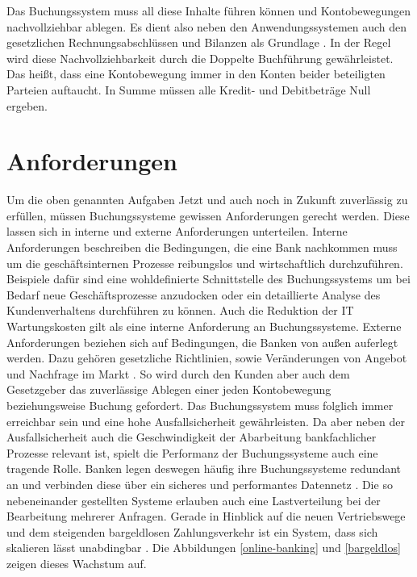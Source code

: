 \documentclass[12pt,oneside,a4paper,parskip]{scrbook}
\begin{document}
Das Buchungssystem muss all diese Inhalte führen können und Kontobewegungen nachvollziehbar ablegen. Es dient also neben den Anwendungssystemen auch den gesetzlichen Rechnungsabschlüssen und Bilanzen als Grundlage \cite{bankEnzy}\cite{MarkstudieKernbankensysteme}. In der Regel wird diese Nachvollziehbarkeit durch die Doppelte Buchführung gewährleistet. Das heißt, dass eine Kontobewegung immer in den Konten beider beteiligten Parteien auftaucht. In Summe müssen alle Kredit- und Debitbeträge Null ergeben\cite{accounting}.

\section{Anforderungen}
Um die oben genannten Aufgaben Jetzt und auch noch in Zukunft zuverlässig zu erfüllen, müssen Buchungssysteme gewissen Anforderungen gerecht werden. Diese lassen sich in interne und externe Anforderungen unterteilen. Interne Anforderungen beschreiben die Bedingungen, die eine Bank nachkommen muss um die geschäftsinternen Prozesse reibungslos und wirtschaftlich durchzuführen. Beispiele dafür sind eine wohldefinierte Schnittstelle des Buchungssystems um bei Bedarf neue Geschäftsprozesse anzudocken oder ein detaillierte Analyse des Kundenverhaltens durchführen zu können. Auch die Reduktion der IT Wartungskosten gilt als eine interne Anforderung an Buchungssysteme. Externe Anforderungen beziehen sich auf Bedingungen, die Banken von außen auferlegt werden. Dazu gehören gesetzliche Richtlinien, sowie Veränderungen von Angebot und Nachfrage im Markt \cite{capgemini}. So wird durch den Kunden aber auch dem Gesetzgeber das zuverlässige Ablegen einer jeden Kontobewegung beziehungsweise Buchung gefordert. Das Buchungssystem muss folglich immer erreichbar sein und eine hohe Ausfallsicherheit gewährleisten. Da aber neben der Ausfallsicherheit auch die Geschwindigkeit der Abarbeitung bankfachlicher Prozesse relevant ist, spielt die Performanz der Buchungssysteme auch eine tragende Rolle. Banken legen deswegen häufig ihre Buchungssysteme redundant an und verbinden diese über ein sicheres und performantes Datennetz \cite{bankEnzy}\cite[97-99]{ITidF}. Die so nebeneinander gestellten Systeme erlauben auch eine Lastverteilung bei der Bearbeitung mehrerer Anfragen. Gerade in Hinblick auf die neuen Vertriebswege und dem steigenden bargeldlosen Zahlungsverkehr ist ein System, dass sich skalieren lässt unabdingbar \cite{bankEnzy}\cite{capgemini}. Die Abbildungen \ref{online-banking} und \ref{bargeldlos} zeigen dieses Wachstum auf.
\end{document}
